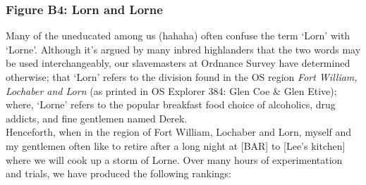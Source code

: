 \documentclass[11pt, english]{article}
\begin{document}
\newpage

		\subsubsection*{Figure B4: Lorn and Lorne}

		Many of the uneducated among us (hahaha) often confuse the term `Lorn' with `Lorne'. Although it's argued by many inbred highlanders that the two words may be used interchangeably, our slavemasters at Ordnance Survey have determined otherwise; that `Lorn' refers to the division found in the OS region \textit{Fort William, Lochaber and Lorn} (as printed in OS Explorer 384: Glen Coe \& Glen Etive); where, `Lorne' refers to the popular breakfast food choice of alcoholics, drug addicts, and fine gentlemen named Derek.\\

		Henceforth, when in the region of Fort William, Lochaber and Lorn, myself and my gentlemen often like to retire after a long night at [BAR] to [Lee's kitchen] where we will cook up a storm of Lorne. Over many hours of experimentation and trials, we have produced the following rankings:
\end{document}
